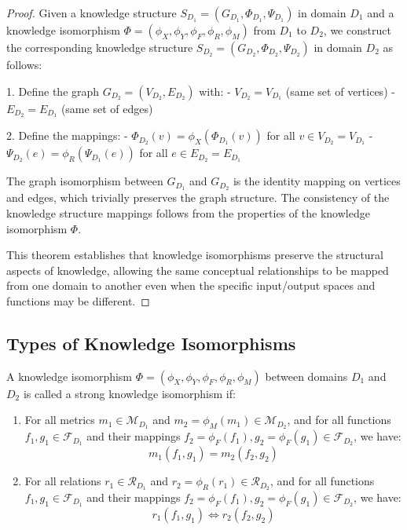 \begin{proof}
Given a knowledge structure $S_{D_1} = (G_{D_1}, \Phi_{D_1}, \Psi_{D_1})$ in domain $D_1$ and a knowledge isomorphism $\Phi = (\phi_X, \phi_Y, \phi_F, \phi_R, \phi_M)$ from $D_1$ to $D_2$, we construct the corresponding knowledge structure $S_{D_2} = (G_{D_2}, \Phi_{D_2}, \Psi_{D_2})$ in domain $D_2$ as follows:

1. Define the graph $G_{D_2} = (V_{D_2}, E_{D_2})$ with:
   - $V_{D_2} = V_{D_1}$ (same set of vertices)
   - $E_{D_2} = E_{D_1}$ (same set of edges)

2. Define the mappings:
   - $\Phi_{D_2}(v) = \phi_X(\Phi_{D_1}(v))$ for all $v \in V_{D_2} = V_{D_1}$
   - $\Psi_{D_2}(e) = \phi_R(\Psi_{D_1}(e))$ for all $e \in E_{D_2} = E_{D_1}$

The graph isomorphism between $G_{D_1}$ and $G_{D_2}$ is the identity mapping on vertices and edges, which trivially preserves the graph structure. The consistency of the knowledge structure mappings follows from the properties of the knowledge isomorphism $\Phi$.

This theorem establishes that knowledge isomorphisms preserve the structural aspects of knowledge, allowing the same conceptual relationships to be mapped from one domain to another even when the specific input/output spaces and functions may be different.
\end{proof}

\subsection{Types of Knowledge Isomorphisms}

\begin{definition}
A knowledge isomorphism $\Phi = (\phi_X, \phi_Y, \phi_F, \phi_R, \phi_M)$ between domains $D_1$ and $D_2$ is called a strong knowledge isomorphism if:
\begin{enumerate}
    \item For all metrics $m_1 \in \mathcal{M}_{D_1}$ and $m_2 = \phi_M(m_1) \in \mathcal{M}_{D_2}$, and for all functions $f_1, g_1 \in \mathcal{F}_{D_1}$ and their mappings $f_2 = \phi_F(f_1), g_2 = \phi_F(g_1) \in \mathcal{F}_{D_2}$, we have:
    \begin{equation}
    m_1(f_1, g_1) = m_2(f_2, g_2)
    \end{equation}
    
    \item For all relations $r_1 \in \mathcal{R}_{D_1}$ and $r_2 = \phi_R(r_1) \in \mathcal{R}_{D_2}$, and for all functions $f_1, g_1 \in \mathcal{F}_{D_1}$ and their mappings $f_2 = \phi_F(f_1), g_2 = \phi_F(g_1) \in \mathcal{F}_{D_2}$, we have:
    \begin{equation}
    r_1(f_1, g_1) \Leftrightarrow r_2(f_2, g_2)
    \end{equation}
\end{enumerate}
\end{definition}


